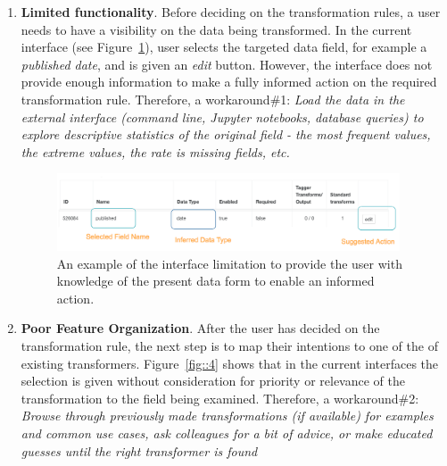 \documentclass[12pt,letterpaper]{article}
\begin{document}
\begin{enumerate}
    \item \textbf{Limited functionality}. Before deciding on the transformation rules, a user needs to have a visibility on the data being transformed. In the current interface (see Figure~\ref{fig::3}), user selects the targeted data field, for example a \textit{published date}, and is given an \textit{edit} button. However, the interface does not provide enough information to make a fully informed action on the required transformation rule. Therefore, a workaround\#1:  
    \textit{Load the data in the external interface (command line, Jupyter notebooks, database queries) to explore descriptive statistics of the original field - the most frequent values,  the extreme values, the rate is missing fields, etc.}
    
    \begin{figure}[h]
    \centering
    \includegraphics[width=4in, scale=.4]{DataVisibility.png}
    \caption{An example of the interface limitation to provide the user with knowledge of the present data form to enable an informed action.}
    \label{fig::3}
    \end{figure}
    
    
    \item \textbf{Poor Feature Organization}. After the user has decided on the transformation rule, the next step is to map their intentions to one of the of existing transformers. Figure~\ref{fig::4} shows that in the current interfaces the selection is given without consideration for priority or relevance of the transformation to the field being examined. Therefore, a workaround\#2:
    \textit{Browse through previously made transformations (if available) for examples and common use cases, ask colleagues for a bit of advice, or make educated guesses until the right transformer is found}
    

\end{enumerate}
\end{document}
